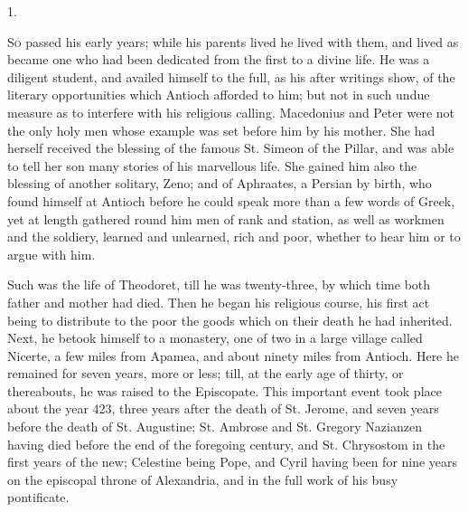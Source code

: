 
1.

S\textsc{o} passed his early years; while his parents lived he lived with
them, and lived as became one who had been dedicated from the first to
a divine life. He was a diligent student, and availed himself to the
full, as his after writings show, of the literary opportunities which
Antioch afforded to him; but not in such undue measure as to interfere
with his religious calling. Macedonius and Peter were not the only
holy men whose example was set before him by his mother. She had
herself received the blessing of the famous St. Simeon of the Pillar,
and was able to tell her son many stories of his marvellous life. She
gained him also the blessing of another solitary, Zeno; and of
Aphraates, a Persian by birth, who found himself at Antioch before he
could speak more than a few words of Greek, yet at length gathered
round him men of rank and station, as well as workmen and the
soldiery, learned and unlearned, rich and poor, whether to hear him or
to argue with him.

Such was the life of Theodoret, till he was twenty-three, by which
time both father and mother had died. Then he began his religious
course, his first act being to distribute to the poor the goods which
on their death he had inherited. Next, he betook himself to a
monastery, one of two in a large village called Nicerte, a few miles
from Apamea, and about ninety miles from Antioch. Here he remained for
seven years, more or less; till, at the early age of thirty, or
thereabouts, he was raised to the Episcopate. This important
event took place about the year 423, three years after the death of
St. Jerome, and seven years before the death of St. Augustine; St.
Ambrose and St. Gregory Nazianzen having died before the end of the
foregoing century, and St. Chrysostom in the first years of the new;
Celestine being Pope, and Cyril having been for nine years on the
episcopal throne of Alexandria, and in the full work of his busy
pontificate.

